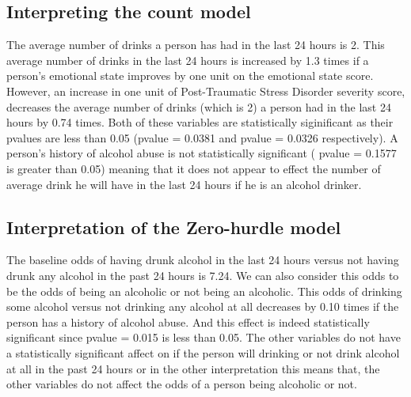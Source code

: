 \documentclass{article}\usepackage[]{graphicx}\usepackage[]{color}
\begin{document}
\subsection*{Interpreting the count model}

The average number of drinks a person has had in the last 24 hours is 2. This average number of drinks in the last 24 hours is increased by 1.3 times if a person's emotional state improves by one unit on the emotional state score. However, an increase in one unit of Post-Traumatic Stress Disorder severity score, decreases the average number of drinks (which is 2) a person had in the last 24 hours by 0.74 times. Both of these variables are statistically siginificant as their pvalues are less than 0.05 (pvalue = 0.0381 and pvalue = 0.0326 respectively). A person's history of alcohol abuse is not statistically significant ( pvalue = 0.1577 is greater than 0.05) meaning that it does not appear to effect the number of average drink he will have in the last 24 hours if he is an alcohol drinker. 


\subsection*{Interpretation of the Zero-hurdle model}

The baseline odds of having drunk alcohol in the last 24 hours versus not having drunk any alcohol in the past 24 hours is 7.24. We can also consider this odds to be the odds of being an alcoholic or not being an alcoholic. This odds of drinking some alcohol versus not drinking any alcohol at all decreases by 0.10 times if the person has a history of alcohol abuse. And this effect is indeed statistically significant since pvalue = 0.015 is less than 0.05. The other variables do not have a statistically significant affect on if the person will drinking or not drink alcohol at all in the past 24 hours or in the other interpretation this means that, the other variables do not affect the odds of a person being alcoholic or not. 
\end{document}
